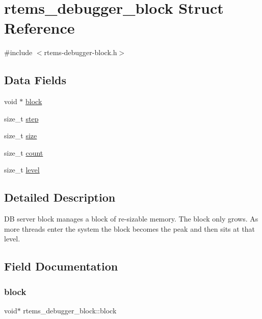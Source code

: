 \hypertarget{structrtems__debugger__block}{}\section{rtems\+\_\+debugger\+\_\+block Struct Reference}
\label{structrtems__debugger__block}


{\ttfamily \#include $<$rtems-\/debugger-\/block.\+h$>$}

\subsection*{Data Fields}
\begin{DoxyCompactItemize}
\item 
void $\ast$ \mbox{\hyperlink{structrtems__debugger__block_a26966a6baa9f4b49119900dff9377b26}{block}}
\item 
size\+\_\+t \mbox{\hyperlink{structrtems__debugger__block_ae105e424755696a260021c83604e4206}{step}}
\item 
size\+\_\+t \mbox{\hyperlink{structrtems__debugger__block_a61b84bb4a0a3548f5bdea27bf295f30f}{size}}
\item 
size\+\_\+t \mbox{\hyperlink{structrtems__debugger__block_a8a94887ef54540a8d6fe75f5c936aa4f}{count}}
\item 
size\+\_\+t \mbox{\hyperlink{structrtems__debugger__block_adb6e594a5334b30a61fbdb1215f0b1c1}{level}}
\end{DoxyCompactItemize}


\subsection{Detailed Description}
DB server block manages a block of re-\/sizable memory. The block only grows. As more threads enter the system the block becomes the peak and then sits at that level. 

\subsection{Field Documentation}
\mbox{\label{structrtems__debugger__block_a26966a6baa9f4b49119900dff9377b26}} 
\subsubsection{\texorpdfstring{block}{block}}
{\footnotesize\ttfamily void$\ast$ rtems\+\_\+debugger\+\_\+block\+::block}

